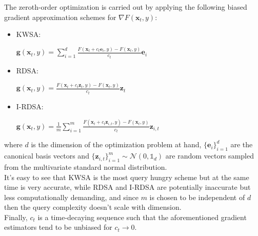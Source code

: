 The zeroth-order optimization is carried out by applying the following biased gradient approximation schemes for $\nabla F(\mathbf{x}_t,y)$:
\begin{itemize}
	\item KWSA:
	\begin{center}
		${\displaystyle\mathbf{g}(\mathbf{x}_t,y) = \sum^{d}_{i=1}\frac{F(\mathbf{x}_t + c_t\mathbf{e}_i,y)-F(\mathbf{x}_t,y)}{c_t}\mathbf{e}_i}$
	\end{center}
	\item RDSA:
	\begin{center}
		${\displaystyle\mathbf{g}(\mathbf{x}_t,y) = \frac{F(\mathbf{x}_t + c_t\mathbf{z}_t,y)-F(\mathbf{x}_t,y)}{c_t}\mathbf{z}_t}$
	\end{center}
	\item I-RDSA:
	\begin{center}
		${\displaystyle\mathbf{g}(\mathbf{x}_t,y) = \frac{1}{m}\sum^{m}_{i=1}\frac{F(\mathbf{x}_t + c_t\mathbf{z}_{i,t},y)-F(\mathbf{x}_t,y)}{c_t}\mathbf{z}_{i,t}}$
	\end{center}
\end{itemize}
where $d$ is the dimension of the optimization problem at hand, $\{\mathbf{e}_i\}_{i=1}^d$ are the canonical basis vectors and $\{\mathbf{z}_{i,t}\}_{i=1}^m\sim\mathcal{N}(0,\mathbb{1}_d)$ are random vectors sampled from the multivariate standard normal distribution.\\
\indent It's easy to see that KWSA is the most query hungry scheme but at the same time is very accurate, while RDSA and I-RDSA are potentially inaccurate but less computationally demanding, and since $m$ is chosen to be independent of $d$ then the query complexity doesn't scale with dimension.\\
\indent Finally, $c_t$ is a time-decaying sequence such that the aforementioned gradient estimators tend to be unbiased for $c_t \rightarrow 0$.\\

